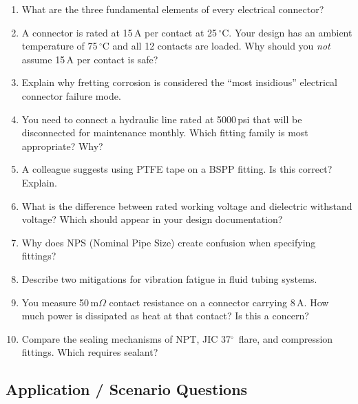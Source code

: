 \documentclass[11pt,letterpaper,twoside,openany]{book}
\newcommand{\degC}{\ensuremath{{}^{\circ}\text{C}}}
\begin{document}
\begin{enumerate}[leftmargin=1.5em]
  \item What are the three fundamental elements of every electrical connector?

  \item A connector is rated at 15\,A per contact at 25\,\degC{}. Your design has an ambient temperature of 75\,\degC{} and all 12 contacts are loaded. Why should you \emph{not} assume 15\,A per contact is safe?

  \item Explain why fretting corrosion is considered the ``most insidious'' electrical connector failure mode.

  \item You need to connect a hydraulic line rated at 5000\,psi that will be disconnected for maintenance monthly. Which fitting family is most appropriate? Why?

  \item A colleague suggests using PTFE tape on a BSPP fitting. Is this correct? Explain.

  \item What is the difference between rated working voltage and dielectric withstand voltage? Which should appear in your design documentation?

  \item Why does NPS (Nominal Pipe Size) create confusion when specifying fittings?

  \item Describe two mitigations for vibration fatigue in fluid tubing systems.

  \item You measure 50\,m$\Omega$ contact resistance on a connector carrying 8\,A. How much power is dissipated as heat at that contact? Is this a concern?

  \item Compare the sealing mechanisms of NPT, JIC 37$^{\circ}$\ flare, and compression fittings. Which requires sealant?
\end{enumerate}

\subsection{Application / Scenario Questions}
\end{document}
